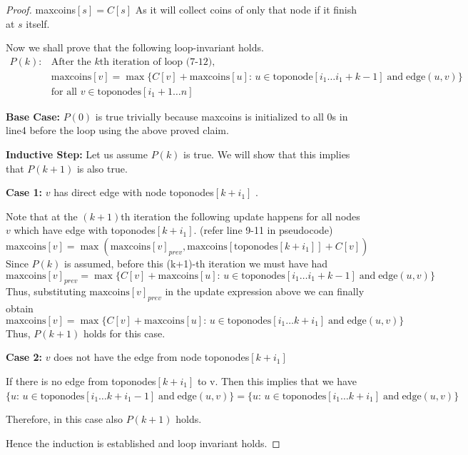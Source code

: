 \documentclass[answers]{exam}
\begin{document}
\begin{questions}
\begin{parts}
\begin{solution}
\begin{proof}
maxcoins$[s]=C[s]$ As it will collect coins of only that node if it finish at $s$ itself.

Now we shall prove that the following loop-invariant holds.
\begin{align*}
    P(k): & \text{After the $k$th iteration of loop (7-12)},\\
          & \text{maxcoins}[v] =  \max \{C[v]+\text{maxcoins}[u]:\, u \in \text{toponode}[i_{1}\ldots i_{1}+k-1] \;\text{and}\; \text{edge}(u, v)\} \\
          & \text{for all } v \in \text{toponodes}[i_{1}+1 \ldots n]
\end{align*}

\textbf{Base Case:} $P(0)$ is true trivially because maxcoins is initialized to all 0s in line4 before the loop using the above proved claim.

\textbf{Inductive Step:} Let us assume $P(k)$ is true. We will show that this implies that $P(k+1)$ is also true.

\textbf{Case 1:} $v$ has direct edge with node toponodes$[k+i_{1}]$ .

Note that at the $(k+1)$th iteration the following update happens for all nodes $v$ which have edge with toponodes$[k+i_{1}]$. (refer line 9-11 in pseudocode)
\[
    \text{maxcoins}[v] = \max (\text{maxcoins}[v]_{prev}, \text{maxcoins}[\text{toponodes}[k+i_{1}]] + C[v])
\]
Since $P(k)$ is assumed, before this (k+1)-th iteration we must have had
\[
    \text{maxcoins}[v]_{prev} = \max \{C[v] + \text{maxcoins}[u]:\, u \in \text{toponodes}[i_1\ldots i_{1}+k-1] \;\text{and}\; \text{edge}(u, v)\} 
\]
Thus, substituting $\text{maxcoins}[v]_{prev}$ in the update expression above we can finally obtain
\[
    \text{maxcoins}[v] = \max \{C[v] + \text{maxcoins}[u]:\, u \in \text{toponodes}[i_1\dots k+i_{1}] \;\text{and}\; \text{edge}(u, v)\} 
\]
Thus, $P(k+1)$ holds for this case.

\textbf{Case 2: } $v$ does not have the edge from node toponodes$[k+i_{1}]$ 

If there is no edge from toponodes$[k+i_{1}]$ to v. Then this implies that we have $\{u:\, u \in \text{toponodes}[i_1\ldots k+i_{1}-1] \;\text{and}\; \text{edge}(u, v)\} = \{u:\, u \in \text{toponodes}[i_1\ldots k+i_{1}] \;\text{and}\; \text{edge}(u, v)\}$

Therefore, in this case also $P(k+1)$ holds.

Hence the induction is established and loop invariant holds.


\end{proof}
\end{solution}
\end{parts}
\end{questions}
\end{document}

